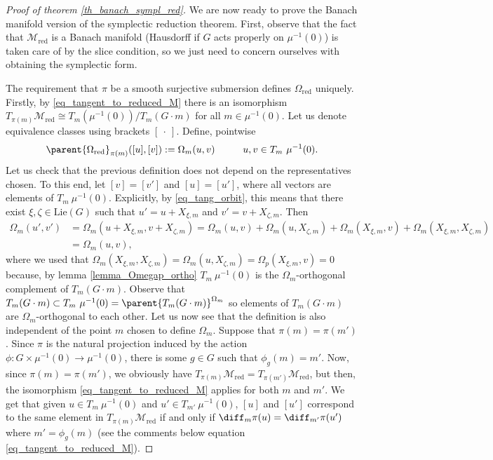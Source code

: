 \begin{proof}[\textit{Proof of theorem} \ref{th_banach_sympl_red}]
    We are now ready to prove the Banach manifold version of the symplectic reduction theorem. First, observe that the fact that \(\mathcal{M}_{\mathrm{red}}\) is a Banach manifold (Hausdorff if \(G\) acts properly on \(\mu^{-1}(0)\)) is taken care of by the slice condition, so we just need to concern ourselves with obtaining the symplectic form.

    The requirement that \(\pi\) be a smooth surjective submersion defines \(\Omega_{\mathrm{red}}\) uniquely. Firstly, by \eqref{eq_tangent_to_reduced_M}  there is an isomorphism \(T_{\pi(m)}\mathcal{M}_{\mathrm{red}} \cong T_m (\mu^{-1}(0))/T_m(G \cdot m)\) for all \(m \in \mu^{-1}(0)\). Let us denote equivalence classes using brackets \([\ \cdot \ ]\). Define, pointwise
    \[
    \parent{\Omega_{\mathrm{red}}}_{\pi(m)}([u], [v]):=\Omega_m(u,v) \hspace{1 cm} u,v \in T_m\ \mu^{-1}(0).
    \]
    Let us check that the previous definition does not depend on the representatives chosen. To this end, let \([v]=[v']\) and \([u]=[u']\), where all vectors are elements of \(T_m \ \mu^{-1}(0)\). Explicitly, by \eqref{eq_tang_orbit}, this means that there exist \(\xi, \zeta \in \mathrm{Lie}(G)\) such that \(u'=u+X_{\xi, m}\) and \(v'=v+X_{\zeta, m}\). Then
    \begin{align*}
        \Omega_m(u', v') & = \Omega_m(u+X_{\xi, m}, v+X_{\zeta, m}) = \Omega_m(u,v) + \Omega_m(u, X_{\zeta, m}) + \Omega_m(X_{\xi, m}, v) + \Omega_m(X_{\xi, m}, X_{\zeta, m}) \\
        & = \Omega_m(u,v),
    \end{align*}
    where we used that \(\Omega_m(X_{\xi, m}, X_{\zeta,m}) = \Omega_m(u, X_{\zeta, m})=\Omega_p(X_{\xi, m}, v)=0\) because, by lemma \ref{lemma_Omegap_ortho} \(T_m \ \mu^{-1}(0)\) is the \(\Omega_m\)-orthogonal complement of \(T_m(G \cdot m)\). Observe that \(T_m(G \cdot m) \subset T_m \ \mu^{-1}(0)=\parent{T_m (G \cdot m)}^{\Omega_m}\) so elements of \(T_m(G \cdot m)\) are \(\Omega_m\)-orthogonal to each other. Let us now see that the definition is also independent of the point \(m\) chosen to define \(\Omega_m\). Suppose that \(\pi(m)=\pi(m')\). Since \(\pi\) is the natural projection induced by the action \(\phi\colon G \times \mu^{-1}(0) \to \mu^{-1}(0)\), there is some \(g \in G\) such that \(\phi_g(m)=m'\). Now, since \(\pi(m)=\pi(m')\), we obviously have \(T_{\pi(m)}\mathcal{M}_{\mathrm{red}}=T_{\pi(m')}\mathcal{M}_{\mathrm{red}}\), but then, the isomorphism \eqref{eq_tangent_to_reduced_M} applies for both \(m\) and \(m'\). We get that given \(u \in T_m \ \mu^{-1}(0)\) and \(u'\in T_{m'} \ \mu^{-1}(0)\), \([u]\) and \([u']\) correspond to the same element in \(T_{\pi(m)}\mathcal{M}_{\mathrm{red}}\) if and only if \(\diff_m\pi(u)=\diff_{m'} \pi(u')\) where \(m'=\phi_g(m)\) (see the comments below equation \eqref{eq_tangent_to_reduced_M}). 

\end{proof}
